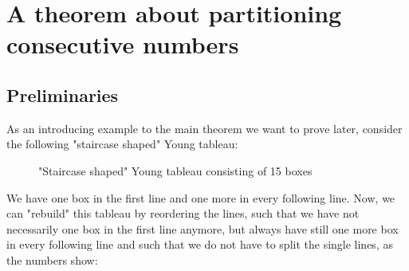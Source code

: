 
\chapter{A theorem about partitioning consecutive numbers} %

\label{Appendix1} %

\section{Preliminaries}
As an introducing example to the main theorem we want to prove later, consider the following "staircase shaped" Young tableau:
\begin{figure}[ht]
\centering
{}
  \caption{"Staircase shaped" Young tableau consisting of 15 boxes}
  \label{figure4:Figure 4}
\end{figure}

We have one box in the first line and one more in every following line. Now, we can "rebuild" this tableau by reordering the lines, such that we have not necessarily one box in the first line anymore, but always have still one more box in every following line and such that we do not have to split the single lines, as the numbers show:

